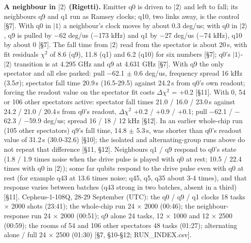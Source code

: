 \documentclass[11pt]{article}
\begin{document}
\textbf{A neighbour in \(|2\rangle\) (Rigetti).} Emitter q0 is driven to \(|2\rangle\) and left to fall; its neighbours q9 and q1 run as Ramsey clocks; q10, two links away, is the control {[}\S{}7{]}. With q0 in \(|1\rangle\) a neighbour's clock moves by about 0.3 deg/us; with q0 in \(|2\rangle\), q9 is pulled by \(-\)62 deg/us (\(-\)173 kHz) and q1 by \(-\)27 deg/us (\(-\)74 kHz), q10 by about 0 {[}\S{}7{]}. The fall time from \(|2\rangle\) read from the spectator is about 20\,\textmu s, with fit residuals \(\chi^2\) of 8.6 (q9), 11.8 (q1) and 6.2 (q10) for six numbers {[}\S{}7{]}; q0's \(|1\rangle\)-\(|2\rangle\) transition is at 4.295 GHz and q9 at 4.631 GHz {[}\S{}7{]}. With q9 the only spectator and all else parked: pull \(-\)62.1 \(\pm\) 0.6 deg/us, frequency spread 16 kHz (3.5\(\sigma\)); spectator fall time 20.9\,\textmu s (16.5-29.5) against 24.2\,\textmu s from q0's own readout; forcing the readout value on the spectator fit costs \(\Delta\)\(\chi^2\) = +0.2 {[}\S{}11{]}. With 0, 54 or 106 other spectators active: spectator fall times 21.0 / 16.0 / 23.0\,\textmu s against 24.2 / 21.0 / 20.4\,\textmu s from q0's readout, \(\Delta\)\(\chi^2\) +0.2 / +0.9 / +0.1; pull \(-\)62.1 / \(-\)62.3 / \(-\)59.9 deg/us; spread 16 / 18 / 12 kHz {[}\S{}12{]}. In an earlier whole-chip run (105 other spectators) q9's fall time, 14.8 \(\pm\) 5.3\,\textmu s, was shorter than q0's readout value of 31.2\,\textmu s (30.0-32.6) {[}\S{}10{]}; the isolated and alternating-group runs above do not repeat that difference {[}\S{}11, \S{}12{]}. Neighbours q1 / q9 respond to q0's state (1.8 / 1.9 times noise when the drive pulse is played with q0 at rest; 10.5 / 22.4 times with q0 in \(|2\rangle\)); some far qubits respond to the drive pulse even with q0 at rest (for example q43 at 13.6 times noise; q45, q5, q35 about 3-4 times), and that response varies between batches (q43 strong in two batches, absent in a third) {[}\S{}11{]}. Cepheus-1-108Q, 28-29 September (UTC): the q0 / q9 / q1 clocks 18 tasks \(\times\) 2000 shots (23:41); the whole-chip run 24 \(\times\) 2000 (00:46); the neighbour-response run 24 \(\times\) 2000 (00:51); q9 alone 24 tasks, 12 \(\times\) 1000 and 12 \(\times\) 2500 (00:59); the rooms of 54 and 106 other spectators 48 tasks (01:27); alternating alone / full 24 \(\times\) 2500 (01:30) {[}\S{}7, \S{}10-\S{}12; RUN\_INDEX.csv{]}.
\end{document}

